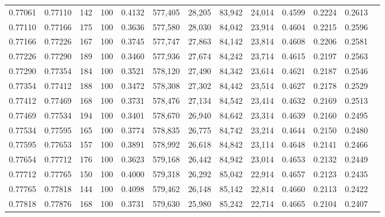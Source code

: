 \begin{tabular}{rrrrrrrrrrrrr}
0.77061 & 0.77110 &   142 & 100 &                                     0.4132 & 577,405 &  28,205 &  83,942 &  24,014 & 0.4599 & 0.2224 & 0.2613 \\
0.77110 & 0.77166 &   175 & 100 &                                     0.3636 & 577,580 &  28,030 &  84,042 &  23,914 & 0.4604 & 0.2215 & 0.2596 \\
0.77166 & 0.77226 &   167 & 100 &                                     0.3745 & 577,747 &  27,863 &  84,142 &  23,814 & 0.4608 & 0.2206 & 0.2581 \\
0.77226 & 0.77290 &   189 & 100 &                                     0.3460 & 577,936 &  27,674 &  84,242 &  23,714 & 0.4615 & 0.2197 & 0.2563 \\
0.77290 & 0.77354 &   184 & 100 &                                     0.3521 & 578,120 &  27,490 &  84,342 &  23,614 & 0.4621 & 0.2187 & 0.2546 \\
0.77354 & 0.77412 &   188 & 100 &                                     0.3472 & 578,308 &  27,302 &  84,442 &  23,514 & 0.4627 & 0.2178 & 0.2529 \\
0.77412 & 0.77469 &   168 & 100 &                                     0.3731 & 578,476 &  27,134 &  84,542 &  23,414 & 0.4632 & 0.2169 & 0.2513 \\
0.77469 & 0.77534 &   194 & 100 &                                     0.3401 & 578,670 &  26,940 &  84,642 &  23,314 & 0.4639 & 0.2160 & 0.2495 \\
0.77534 & 0.77595 &   165 & 100 &                                     0.3774 & 578,835 &  26,775 &  84,742 &  23,214 & 0.4644 & 0.2150 & 0.2480 \\
0.77595 & 0.77653 &   157 & 100 &                                     0.3891 & 578,992 &  26,618 &  84,842 &  23,114 & 0.4648 & 0.2141 & 0.2466 \\
0.77654 & 0.77712 &   176 & 100 &                                     0.3623 & 579,168 &  26,442 &  84,942 &  23,014 & 0.4653 & 0.2132 & 0.2449 \\
0.77712 & 0.77765 &   150 & 100 &                                     0.4000 & 579,318 &  26,292 &  85,042 &  22,914 & 0.4657 & 0.2123 & 0.2435 \\
0.77765 & 0.77818 &   144 & 100 &                                     0.4098 & 579,462 &  26,148 &  85,142 &  22,814 & 0.4660 & 0.2113 & 0.2422 \\
0.77818 & 0.77876 &   168 & 100 &                                     0.3731 & 579,630 &  25,980 &  85,242 &  22,714 & 0.4665 & 0.2104 & 0.2407 \\

\end{tabular}
